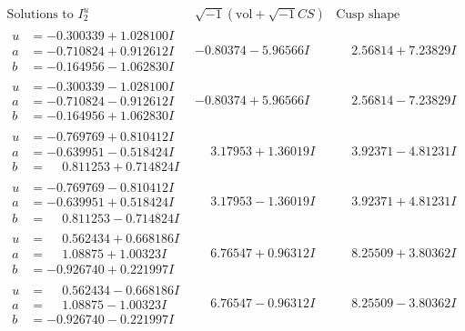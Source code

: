 \documentclass[1p]{elsarticle_modified}
\theoremstyle{definition}
\newcommand{\I}{\sqrt{-1}}
\begin{document}
$$\begin{array}{c|c|c}  
\text{Solutions to }I^u_{2}& \I (\text{vol} + \sqrt{-1}CS) & \text{Cusp shape}\\
 \hline 
\begin{aligned}
u &= -0.300339 + 1.028100 I \\
a &= -0.710824 + 0.912612 I \\
b &= -0.164956 - 1.062830 I\end{aligned}
 & -0.80374 - 5.96566 I & \phantom{-}2.56814 + 7.23829 I \\ \hline\begin{aligned}
u &= -0.300339 - 1.028100 I \\
a &= -0.710824 - 0.912612 I \\
b &= -0.164956 + 1.062830 I\end{aligned}
 & -0.80374 + 5.96566 I & \phantom{-}2.56814 - 7.23829 I \\ \hline\begin{aligned}
u &= -0.769769 + 0.810412 I \\
a &= -0.639951 - 0.518424 I \\
b &= \phantom{-}0.811253 + 0.714824 I\end{aligned}
 & \phantom{-}3.17953 + 1.36019 I & \phantom{-}3.92371 - 4.81231 I \\ \hline\begin{aligned}
u &= -0.769769 - 0.810412 I \\
a &= -0.639951 + 0.518424 I \\
b &= \phantom{-}0.811253 - 0.714824 I\end{aligned}
 & \phantom{-}3.17953 - 1.36019 I & \phantom{-}3.92371 + 4.81231 I \\ \hline\begin{aligned}
u &= \phantom{-}0.562434 + 0.668186 I \\
a &= \phantom{-}1.08875 + 1.00323 I \\
b &= -0.926740 + 0.221997 I\end{aligned}
 & \phantom{-}6.76547 + 0.96312 I & \phantom{-}8.25509 + 3.80362 I \\ \hline\begin{aligned}
u &= \phantom{-}0.562434 - 0.668186 I \\
a &= \phantom{-}1.08875 - 1.00323 I \\
b &= -0.926740 - 0.221997 I\end{aligned}
 & \phantom{-}6.76547 - 0.96312 I & \phantom{-}8.25509 - 3.80362 I \\ \hline\begin{aligned}

\end{aligned}
\end{array}$$
\end{document}
